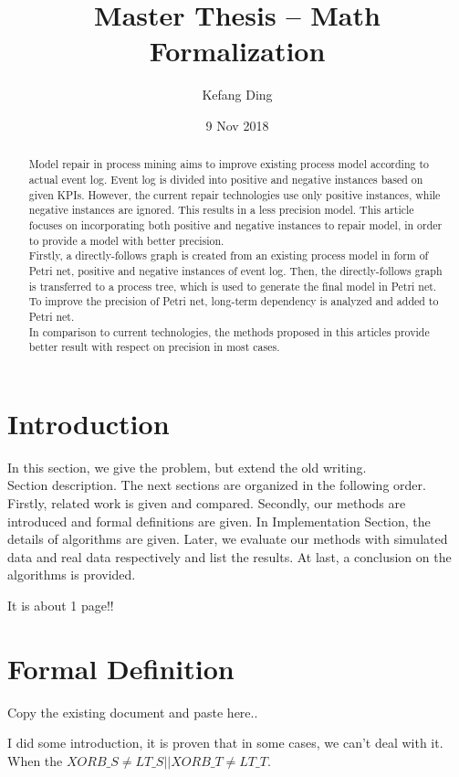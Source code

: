 \documentclass[]{article}
\title{Master Thesis --  Math Formalization}
\author{Kefang Ding}
\date{9 Nov 2018}
\begin{document}
\maketitle
\hrulefill
\begin{abstract}
Model repair in process mining aims to improve existing process model according to actual event log. Event log is divided into positive and negative instances based on given KPIs. However, the current repair technologies use only positive instances, while negative instances are ignored. This results in a  less precision model. This article focuses on incorporating both positive and negative instances to repair model, in order to provide a model with better precision. 
\\
Firstly, a directly-follows graph is created from an existing process model in form of Petri net,  positive and negative instances of event log. Then, the directly-follows graph is transferred to a process tree, which is used to generate the final model in Petri net. To improve the precision of Petri net, long-term dependency is analyzed and added to Petri net. 
\\ 
In comparison to current technologies, the methods proposed in this articles provide better result with respect on precision in most cases. 
\end{abstract}
\pagebreak
\section{Introduction}
In this section, we give the problem, but extend the old writing. 
\\

Section description. The next sections are organized in the following order. Firstly, related work is given and compared. Secondly, our methods are introduced and formal definitions are given. In Implementation Section, the details of algorithms are given. Later, we evaluate our methods with simulated data and real data respectively and list the results. At last, a conclusion on the algorithms is provided. 

It is about 1 page!!

\section{Formal Definition}
Copy the existing document and paste here.. 

I did some introduction, it is proven that in some cases, we can't deal with it. When the $XORB\_S \neq LT\_S || XORB\_T \neq LT\_T$.
\end{document}
